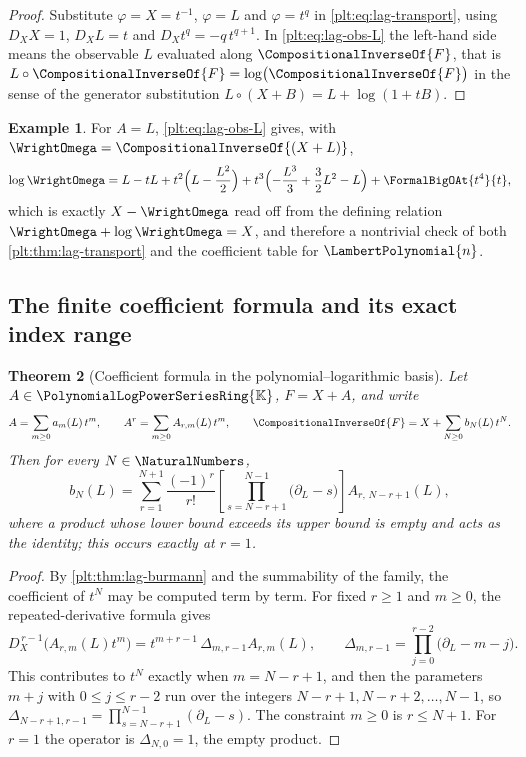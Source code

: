 \documentclass[11pt,oneside]{article}
\theoremstyle{plain}
\newtheorem{theorem}{Theorem}[section]
\theoremstyle{definition}
\newtheorem{example}[theorem]{Example}
\theoremstyle{remark}
\newcommand{\K}{\mathbb{K}}
\newcommand{\PLpow}{\PolynomialLogPowerSeriesRing{\K}}   %
\newcommand{\DX}{D_{X}}                                  %
\newcommand{\shiftop}[2]{\Delta_{#1,#2}}                 %
\newcommand{\compose}{\mathbin{\circ}}
\newcommand{\rev}[1]{\CompositionalInverseOf{#1}}
\newcommand{\LamP}[1]{\LambertPolynomial{#1}}
\begin{document}
\begin{proof}
Substitute \(\varphi=X=t^{-1}\), \(\varphi=L\) and \(\varphi=t^q\) in
\cref{plt:eq:lag-transport}, using \(\DX X=1\), \(\DX L=t\) and
\(\DX t^q=-q\,t^{q+1}\).  In \cref{plt:eq:lag-obs-L} the left-hand side means
the observable \(L\) evaluated along \(\rev{F}\), that is
\(L\compose\rev{F}=\log\bigl(\rev{F}\bigr)\) in the sense of the generator
substitution \(L\compose(X+B)=L+\log(1+tB)\).
\end{proof}

\begin{example}
\label{plt:ex:lag-omega-log}
For \(A=L\), \cref{plt:eq:lag-obs-L} gives, with \(\WrightOmega=\rev{(X+L)}\),
\[
  \log\WrightOmega
  =L-tL+t^2\Bigl(L-\frac{L^2}{2}\Bigr)
   +t^3\Bigl(-\frac{L^3}{3}+\frac32L^2-L\Bigr)+\FormalBigOAt{t^4}{t},
\]
which is exactly \(X-\WrightOmega\) read off from the defining relation
\(\WrightOmega+\log\WrightOmega=X\), and therefore a nontrivial check of both
\cref{plt:thm:lag-transport} and the coefficient table for \(\LamP{n}\).
\end{example}

\subsection{The finite coefficient formula and its exact index range}
\label{plt:sec:lag-coefficients}

\begin{theorem}[Coefficient formula in the polynomial--logarithmic basis]
\label{plt:thm:lag-coefficients}
Let \(A\in\PLpow\), \(F=X+A\), and write
\[
  A=\sum_{m\ge0}a_m(L)\,t^m,
  \qquad
  A^r=\sum_{m\ge0}A_{r,m}(L)\,t^m,
  \qquad
  \rev{F}=X+\sum_{N\ge0}b_N(L)\,t^N .
\]
Then for every \(N\in\NaturalNumbers\),
\begin{equation}
\label{plt:eq:lag-coefficients}
  b_N(L)
  =\sum_{r=1}^{N+1}\frac{(-1)^r}{r!}
    \left[\prod_{s=N-r+1}^{N-1}\bigl(\partial_L-s\bigr)\right]
    A_{r,\,N-r+1}(L),
\end{equation}
where a product whose lower bound exceeds its upper bound is empty and acts as
the identity; this occurs exactly at \(r=1\).
\end{theorem}

\begin{proof}
By \cref{plt:thm:lag-burmann} and the summability of the family, the
coefficient of \(t^N\) may be computed term by term.  For fixed \(r\ge1\) and
\(m\ge0\), the repeated-derivative formula gives
\[
  \DX^{\,r-1}\bigl(A_{r,m}(L)t^m\bigr)
  =t^{m+r-1}\,\shiftop{m}{r-1}A_{r,m}(L),
  \qquad
  \shiftop{m}{r-1}=\prod_{j=0}^{r-2}\bigl(\partial_L-m-j\bigr).
\]
This contributes to \(t^N\) exactly when \(m=N-r+1\), and then the parameters
\(m+j\) with \(0\le j\le r-2\) run over the integers
\(N-r+1,N-r+2,\ldots,N-1\), so \(\shiftop{N-r+1}{r-1}=
\prod_{s=N-r+1}^{N-1}(\partial_L-s)\).  The constraint \(m\ge0\) is
\(r\le N+1\).  For \(r=1\) the operator is \(\shiftop{N}{0}=1\), the empty
product.
\end{proof}
\end{document}

